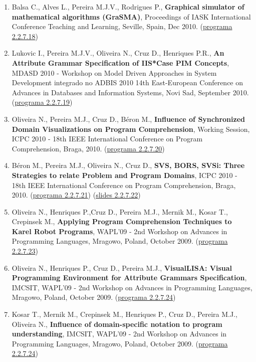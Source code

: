 \documentclass[11pt]{article}
\begin{document}
\begin{enumerate}
\item {Balsa C., Alves L., Pereira M.J.V., Rodrigues P., {\bf{ Graphical simulator of mathematical algorithms (GraSMA)}}, Proceedings of IASK International Conference Teaching and Learning, Seville, Spain, Dec 2010. (\href{run:ComunicacoesOrais/programas/IASK2010prog.pdf}{programa 2.2.7.18})}

\item  {Lukovic I., Pereira M.J.V., Oliveira N., Cruz D., Henriques P.R., {\bf{ An Attribute Grammar Specification of IIS*Case PIM Concepts}}, MDASD 2010 - Workshop on Model Driven Approaches in System Development integrado no ADBIS 2010 14th East-European Conference on Advances in Databases and Information Systems, Novi Sad, September 2010. (\href{run:ComunicacoesOrais/programas/adbis2010prog.pdf}{programa 2.2.7.19})}

\item {Oliveira N., Pereira M.J., Cruz D., Béron M., {\bf{ Influence of Synchronized Domain Visualizations on Program Comprehension}}, Working Session, ICPC 2010 - 18th IEEE International Conference on Program Comprehension, Braga, 2010. (\href{run:ComunicacoesOrais/programas/ICPC2010.pdf}{programa 2.2.7.20})}

\item {Béron M., Pereira M.J., Oliveira N., Cruz D., {\bf{ SVS, BORS, SVSi: Three Strategies to relate Problem and Program Domains}}, ICPC 2010 - 18th IEEE International Conference on Program Comprehension, Braga, 2010. (\href{run:ComunicacoesOrais/programas/ICPC2010.pdf}{programa 2.2.7.21}) (\href{run:ComunicacoesOrais/ICPC10apres.pdf}{slides 2.2.7.22})}

\item {Oliveira N., Henriques P.,Cruz D., Pereira M.J., Mernik M., Kosar T., Crepinsek M., {\bf{ Applying Program Comprehension Techniques to Karel Robot Programs}}, WAPL'09 - 2nd Workshop on Advances in Programming Languages, Mragowo, Poland, October 2009. (\href{run:ComunicacoesOrais/programas/WAPL2009.pdf}{programa 2.2.7.23})}

\item {Oliveira N., Henriques P., Cruz D., Pereira M.J., {\bf{ VisualLISA: Visual Programming Environment for Attribute Grammars Specification}}, IMCSIT, WAPL'09 - 2nd Workshop on Advances in Programming Languages, Mragowo, Poland, October 2009. (\href{run:ComunicacoesOrais/programas/WAPL2009.pdf}{programa 2.2.7.24})}

\item {Kosar T., Mernik M., Crepinsek M., Henriques P., Cruz D., Pereira M.J., Oliveira N., {\bf{ Influence of domain-specific notation to program understanding}}, IMCSIT, WAPL'09 - 2nd Workshop on Advances in Programming Languages, Mragowo, Poland, October 2009. (\href{run:ComunicacoesOrais/programas/WAPL2009.pdf}{programa 2.2.7.24})}


\end{enumerate}
\end{document}
